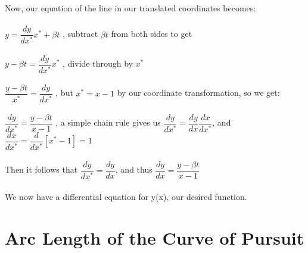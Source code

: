 \documentclass[12pt]{article}
\begin{document}
	Now, our equation of the line in our translated coordinates becomes:
	\\
	\\
	$y=\dfrac{dy}{dx^*}x^{*}+\beta t $ \hspace{1cm} , subtract $\beta t$ from both sides to get
	\\
	\\
	$y -\beta t=\dfrac{dy}{dx^*}x^{*}$ \hspace{1cm} , divide through by $x^{*}$\\
	\\
	$\dfrac{y -\beta t}{x^{*}}=\dfrac{dy}{dx^*}$ \hspace{1.3cm} , but $x^{*}=x-1$ by our coordinate transformation, so we get:\\
	\\
	$\dfrac{dy}{dx^*} = \dfrac{y -\beta t}{x-1}$ \hspace{1.3cm} , a simple chain rule gives us $\dfrac{dy}{dx^*}=\dfrac{dy}{dx}\dfrac{dx}{dx^*}$, and $\dfrac{dx}{dx^*}=\dfrac{d}{dx^*}[x^*-1]=1$
	\\
	\\
	\indent Then it follows that $\dfrac{dy}{dx^*}=\dfrac{dy}{dx}$, and thus $\dfrac{dy}{dx} = \dfrac{y -\beta t}{x-1}$
	\\
	\\
	\indent We now have a differential equation for y(x), our desired function. 
	\\
	
	\section{Arc Length of the Curve of Pursuit}
	
\end{document}
